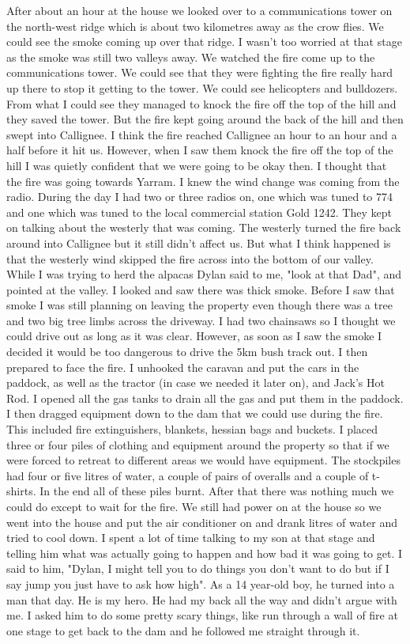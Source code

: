 \documentclass[a4paper]{article}
\begin{document}
        After about an hour at the house we looked over to a communications tower on the north-west ridge which is about two kilometres away as the crow flies. We could see the smoke coming up over that ridge. I wasn't too worried at that stage as the smoke was still two valleys away. We watched the fire come up to the communications tower. We could see that they were fighting the fire really hard up there to stop it getting to the tower. We could see helicopters and bulldozers. From what I could see they managed to knock the fire off the top of the hill and they saved the tower. But the fire kept going around the back of the hill and then swept into Callignee. I think the fire reached Callignee an hour to an hour and a half before it hit us. However, when I saw them knock the fire off the top of the hill I was quietly confident that we were going to be okay then. I thought that the fire was going towards Yarram.
        I knew the wind change was coming from the radio. During the day I had two or three radios on, one which was tuned to 774 and one which was tuned to the local commercial station Gold 1242. They kept on talking about the westerly that was coming. The westerly turned the fire back around into Callignee but it still didn't affect us. But what I think happened is that the westerly wind skipped the fire across into the bottom of our valley.
        While I was trying to herd the alpacas Dylan said to me, "look at that Dad", and pointed at the valley. I looked and saw there was thick smoke. Before I saw that smoke I was still planning on leaving the property even though there was a tree and two big tree limbs across the driveway. I had two chainsaws so I thought we could drive out as long as it was clear. However, as soon as I saw the smoke I decided it would be too dangerous to drive the 5km bush track out.
        I then prepared to face the fire. I unhooked the caravan and put the cars in the paddock, as well as the tractor (in case we needed it later on), and Jack's Hot Rod. I opened all the gas tanks to drain all the gas and put them in the paddock.
        I then dragged equipment down to the dam that we could use during the fire. This included fire extinguishers, blankets, hessian bags and buckets. I placed three or four piles of clothing and equipment around the property so that if we were forced to retreat to different areas we would have equipment. The stockpiles had four or five litres of water, a couple of pairs of overalls and a couple of t-shirts. In the end all of these piles burnt.
        After that there was nothing much we could do except to wait for the fire. We still had power on at the house so we went into the house and put the air conditioner on and drank litres of water and tried to cool down. I spent a lot of time talking to my son at that stage and telling him what was actually going to happen and how bad it was going to get. I said to him, "Dylan, I might tell you to do things you don't want to do but if I say jump you just have to ask how high". As a 14 year-old boy, he turned into a man that day. He is my hero. He had my back all the way and didn't argue with me. I asked him to do some pretty scary things, like run through a wall of fire at one stage to get back to the dam and he followed me straight through it.
\end{document}
